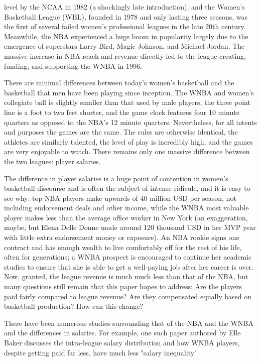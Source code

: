 \documentclass[12pt, titlepage]{article}
\begin{document}
level by the NCAA in 1982 (a shockingly late introduction), and the Women’s Basketball League (WBL), founded in 1978 and only lasting three seasons, was 
the first of several failed women’s professional leagues in the late 20th century. Meanwhile, the NBA experienced a huge boom in popularity largely due to 
the emergence of superstars Larry Bird, Magic Johnson, and Michael Jordan. The massive increase in NBA reach and revenue directly led to the league 
creating, funding, and supporting the WNBA in 1996.
\par
There are minimal differences between today's women’s basketball and the basketball that men have been playing since inception. The WNBA and women's 
collegiate ball is slightly smaller than that used by male players, the three point line is a foot to two feet shorter, and the game clock features 
four 10 minute quarters as opposed to the NBA’s 12 minute quarters. Nevertheless, for all intents and purposes the games are the same. The rules are otherwise 
identical, the athletes are similarly talented, the level of play is incredibly high, and the games are very enjoyable to watch. There remains only one 
massive difference between the two leagues: player salaries.
\par
The difference in player salaries is a huge point of contention in women’s basketball discourse and is often the subject of intense ridicule, and it is 
easy to see why: top NBA players make upwards of 40 million USD per season, not including endorsement deals and other income, while the WNBA most valuable 
player makes less than the average office worker in New York (an exaggeration, maybe, but Elena Delle Donne made around 120 thousand USD in her MVP year 
with little extra endorsement money or exposure). An NBA rookie signs one contract and has enough wealth to live comfortably off for the rest of his life, 
often for generations; a WNBA prospect is encouraged to continue her academic studies to ensure that she is able to get a well-paying job after her career 
is over. Now, granted, the league revenue is much much less than that of the NBA, but many questions still remain that this paper hopes to address: Are 
the players paid fairly compared to league revenue? Are they compensated equally based on basketball production? How can this change?
\par
There have been numerous studies surrounding that of the NBA and the WNBA and the differences in salaries.
For example, one such paper authored by Elle Baker discusses the intra-league salary distribution and
how WNBA players, despite getting paid far less, have much less "salary inequality"
\end{document}
